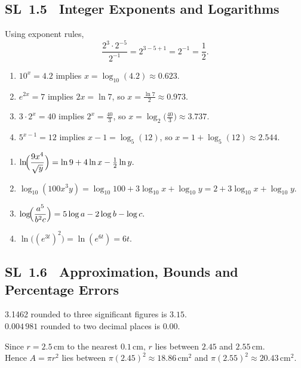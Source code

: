 \documentclass[11pt]{article}
\newcommand{\tocsubsection}[1]{\subsection{#1}}
\begin{document}
\tocsubsection{SL 1.5 \; Integer Exponents and Logarithms}


\begin{solution}
Using exponent rules,
\[
\frac{2^3\cdot 2^{-5}}{2^{-1}} = 2^{3-5+1} = 2^{-1} = \frac{1}{2}.
\]
\end{solution}


\begin{solution}
\begin{enumerate}[label=(\alph*)]
\item $10^{x}=4.2$ implies $x=\log_{10}(4.2)\approx 0.623$.
\item $e^{2x}=7$ implies $2x=\ln 7$, so $x=\frac{\ln 7}{2}\approx 0.973$.
\item $3\cdot 2^x=40$ implies $2^x=\frac{40}{3}$, so $x=\log_{2}\!\bigl(\tfrac{40}{3}\bigr)\approx 3.737$.
\item $5^{x-1}=12$ implies $x-1=\log_{5}(12)$, so $x=1+\log_{5}(12)\approx 2.544$.
\end{enumerate}
\end{solution}

\begin{solution}
\begin{enumerate}[label=(\alph*)]
\item $\displaystyle \ln\!\Bigl(\frac{9x^4}{\sqrt{y}}\Bigr) = \ln 9 + 4\ln x - \tfrac{1}{2}\ln y.$
\item $\displaystyle \log_{10}(100x^3y) = \log_{10}100 + 3\log_{10}x + \log_{10}y = 2 + 3\log_{10}x + \log_{10}y.$
\item $\displaystyle \log\!\Bigl(\frac{a^5}{b^2 c}\Bigr) = 5\log a - 2\log b - \log c.$
\item $\displaystyle \ln\!\bigl((e^{3t})^2\bigr) = \ln(e^{6t}) = 6t.$
\end{enumerate}
\end{solution}

\tocsubsection{SL 1.6 \; Approximation, Bounds and Percentage Errors}

\begin{solution}
3.1462 rounded to three significant figures is $3.15$.  \\
$0.004\,981$ rounded to two decimal places is $0.00$.
\end{solution}

\begin{solution}
Since $r=2.5$\,cm to the nearest $0.1$\,cm, $r$ lies between $2.45$ and $2.55$\,cm.\\
Hence $A=\pi r^2$ lies between $\pi(2.45)^2\approx 18.86\,\text{cm}^2$ and $\pi(2.55)^2\approx 20.43\,\text{cm}^2$.
\end{solution}
\end{document}
